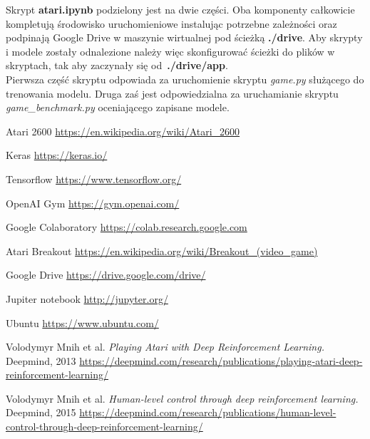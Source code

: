 \documentclass[12pt]{article}
\begin{document}
Skrypt \textbf{atari.ipynb} podzielony jest na dwie części. Oba komponenty całkowicie kompletują środowisko uruchomieniowe instalując potrzebne zależności oraz podpinają Google Drive w maszynie wirtualnej pod ścieżką \textbf{./drive}. Aby skrypty i modele zostały odnalezione należy więc skonfigurować ścieżki do plików w skryptach, tak aby zaczynały się od~\textbf{./drive/app}.
\\

Pierwsza część skryptu odpowiada za uruchomienie skryptu \textit{game.py} służącego do trenowania modelu. Druga zaś jest odpowiedzialna za uruchamianie skryptu \textit{game\_benchmark.py} oceniającego zapisane modele.

\newpage

\begin{thebibliography}{9}

  Atari 2600 \url{https://en.wikipedia.org/wiki/Atari_2600}

Keras \url{https://keras.io/}

Tensorflow \url{https://www.tensorflow.org/}

  OpenAI Gym \url{https://gym.openai.com/}

  Google Colaboratory \url{https://colab.research.google.com}

  Atari Breakout \url{https://en.wikipedia.org/wiki/Breakout_(video_game)}

Google Drive \url{https://drive.google.com/drive/}

Jupiter notebook \url{http://jupyter.org/}

Ubuntu \url{https://www.ubuntu.com/}

  Volodymyr Mnih et al. 
\textit{Playing Atari with Deep Reinforcement Learning.} Deepmind, 2013
   \url{https://deepmind.com/research/publications/playing-atari-deep-reinforcement-learning/}

  Volodymyr Mnih et al. 
\textit{Human-level control through deep reinforcement learning.} Deepmind, 2015
   \url{https://deepmind.com/research/publications/human-level-control-through-deep-reinforcement-learning/}


\end{thebibliography}
\end{document}
